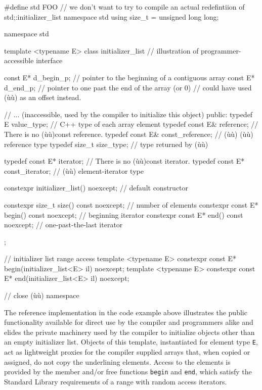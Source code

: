 \begin{emcppshiddenlisting}[emcppsbatch=e1]
#define std FOO // we don't want to try to compile an actual redefintiion of std;:initializer_list
namespace std {
   using size_t = unsigned long long;
}
\end{emcppshiddenlisting}
\begin{emcppslisting}[emcppsbatch=e1]
namespace std
{

template <typename E>
class initializer_list  // illustration of programmer-accessible interface
{
    const E* d_begin_p;  // pointer to the beginning of a contiguous array
    const E* d_end_p;    // pointer to one past the end of the array (or 0)
                         // could have used (ù{}ù) as an offset instead.

    // ... (inaccessible, used by the compiler to initialize this object)
public:
    typedef E value_type;               // C++ type of each array element
    typedef const E& reference;         // There is no (ù{}ù)const reference.
    typedef const E& const_reference;   // (ù{}ù) (ù{}ù) reference type
    typedef size_t size_type;           // type returned by (ù{}ù)

    typedef const E* iterator;          // There is no (ù{}ù)const iterator.
    typedef const E* const_iterator;    // (ù{}ù) element-iterator type

    constexpr initializer_list() noexcept;  // default constructor

    constexpr size_t size() const noexcept;     // number of elements
    constexpr const E* begin() const noexcept;  // beginning iterator
    constexpr const E* end() const noexcept;    // one-past-the-last iterator
};

// initializer list range access
template <typename E> constexpr const E* begin(initializer_list<E> il) noexcept;
template <typename E> constexpr const E* end(initializer_list<E> il) noexcept;

}  // close (ù{}ù) namespace
\end{emcppslisting}
    

\noindent The reference implementation in the code example above illustrates the
public functionality available for direct use by the compiler and
programmers alike and elides the private machinery used by the compiler
to initialize objects other than an empty initializer list. Objects of
this template, instantiated for element type \lstinline!E!, act as
lightweight proxies for the compiler supplied arrays that, when copied
or assigned, do not copy the underlining elements. Access to the
elements is provided by the member and/or free functions \lstinline!begin!
and \lstinline!end!, which satisfy the Standard Library requirements of a
range with random access iterators.

